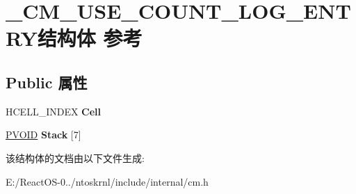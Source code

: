 \hypertarget{struct___c_m___u_s_e___c_o_u_n_t___l_o_g___e_n_t_r_y}{}\section{\+\_\+\+C\+M\+\_\+\+U\+S\+E\+\_\+\+C\+O\+U\+N\+T\+\_\+\+L\+O\+G\+\_\+\+E\+N\+T\+R\+Y结构体 参考}
\label{struct___c_m___u_s_e___c_o_u_n_t___l_o_g___e_n_t_r_y}
\subsection*{Public 属性}
\begin{DoxyCompactItemize}
\item 
\mbox{\label{struct___c_m___u_s_e___c_o_u_n_t___l_o_g___e_n_t_r_y_a04905b80f325144a0b8c0ad6e99c8823}} 
H\+C\+E\+L\+L\+\_\+\+I\+N\+D\+EX {\bfseries Cell}
\item 
\mbox{\label{struct___c_m___u_s_e___c_o_u_n_t___l_o_g___e_n_t_r_y_a8b6bffc54c5f2c03c48564cb3964c50d}} 
\hyperlink{interfacevoid}{P\+V\+O\+ID} {\bfseries Stack} \mbox{[}7\mbox{]}
\end{DoxyCompactItemize}


该结构体的文档由以下文件生成\+:\begin{DoxyCompactItemize}
\item 
E\+:/\+React\+O\+S-\/0../ntoskrnl/include/internal/cm.\+h\end{DoxyCompactItemize}
